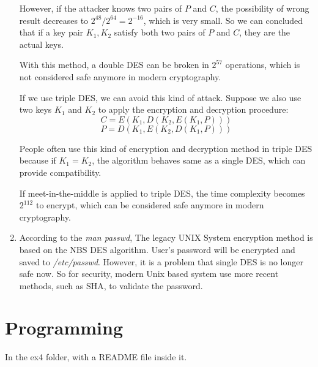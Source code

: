 \documentclass{article}
\begin{document}
\begin{enumerate}
However, if the attacker knows two pairs of $P$ and $C$, the possibility of wrong result decreases to $2^{48}/2^{64}=2^{-16}$, which is very small. So we can concluded that if a key pair $K_1,K_2$ satisfy both two pairs of $P$ and $C$, they are the actual keys.

With this method, a double DES can be broken in $2^{57}$ operations, which is not considered safe anymore in modern cryptography.

If we use triple DES, we can avoid this kind of attack. Suppose we also use two keys $K_1$ and $K_2$ to apply the encryption and decryption procedure:
$$C=E(K_1,D(K_2,E(K_1,P)))$$
$$P=D(K_1,E(K_2,D(K_1,P)))$$

People often use this kind of encryption and decryption method in triple DES because if $K_1=K_2$, the algorithm behaves same as a single DES, which can provide compatibility.

If meet-in-the-middle is applied to triple DES, the time complexity becomes $2^{112}$ to encrypt, which can be considered safe anymore in modern cryptography.

\item
According to the \emph{man passwd}, The legacy UNIX System encryption method is based on the NBS DES algorithm. User's password will be encrypted and saved to \emph{/etc/passwd}. However, it is a problem that single DES is no longer safe now. So for security, modern Unix based system use more recent methods, such as SHA, to validate the password.

\end{enumerate}

\section{Programming}
In the ex4 folder, with a README file inside it.
\end{document}
